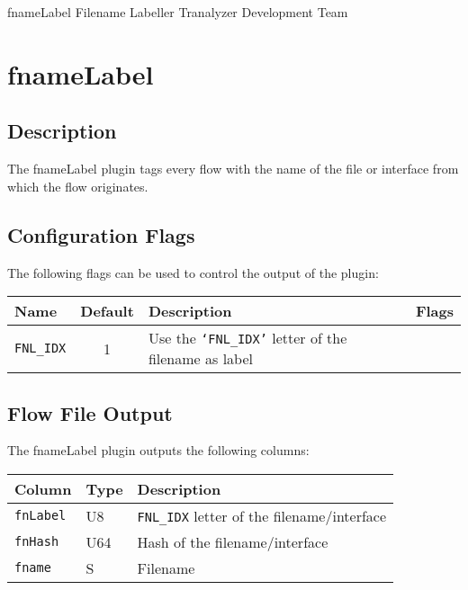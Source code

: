 \documentclass[documentation]{subfiles}
\begin{document}
\trantitle
    {fnameLabel} %
    {Filename Labeller} %
    {Tranalyzer Development Team} %

\section{fnameLabel}\label{s:fnameLabel}

\subsection{Description}
The fnameLabel plugin tags every flow with the name of the file or interface from which the flow originates.

\subsection{Configuration Flags}
The following flags can be used to control the output of the plugin:
\begin{longtable}{lcll}
    \toprule
    {\bf Name} & {\bf Default} & {\bf Description} & {\bf Flags}\\
    \midrule\endhead%
    {\tt FNL\_IDX} & 1 & Use the {\tt `FNL\_IDX'} letter of the filename as label\\
    \bottomrule
\end{longtable}

\subsection{Flow File Output}
The fnameLabel plugin outputs the following columns:
\begin{longtable}{lll}
    \toprule
    {\bf Column} & {\bf Type} & {\bf Description}\\
    \midrule\endhead%
    {\tt fnLabel} & U8  & {\tt FNL\_IDX} letter of the filename/interface\\
    {\tt fnHash}  & U64 & Hash of the filename/interface\\
    {\tt fname}   & S   & Filename\\
    \bottomrule
\end{longtable}
\end{document}
